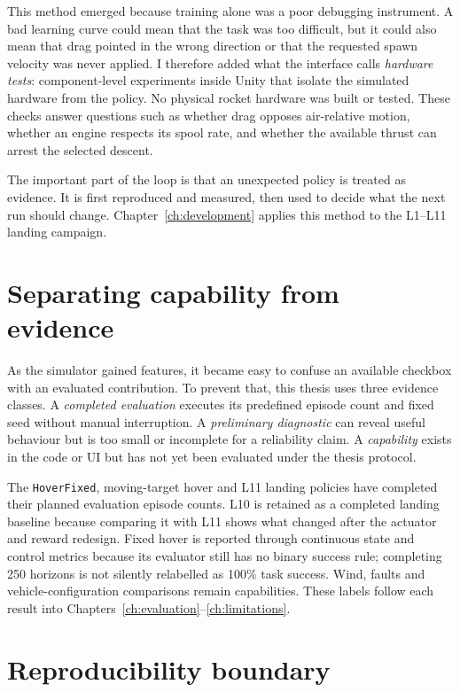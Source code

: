 This method emerged because training alone was a poor debugging instrument. A bad learning
curve could mean that the task was too difficult, but it could also mean that drag pointed in
the wrong direction or that the requested spawn velocity was never applied. I therefore added
what the interface calls \emph{hardware tests}: component-level experiments inside Unity that
isolate the simulated hardware from the policy. No physical rocket hardware was built or
tested. These checks answer questions such as whether drag opposes air-relative motion, whether
an engine respects its spool rate, and whether the available thrust can arrest the selected
descent.

The important part of the loop is that an unexpected policy is treated as evidence. It is first
reproduced and measured, then used to decide what the next run should change. Chapter~\ref{ch:development}
applies this method to the L1--L11 landing campaign.

\section{Separating capability from evidence}

As the simulator gained features, it became easy to confuse an available checkbox with an
evaluated contribution. To prevent that, this thesis uses three evidence classes. A
\emph{completed evaluation} executes its predefined episode count and fixed seed without manual
interruption. A \emph{preliminary diagnostic} can reveal useful behaviour but is too small or
incomplete for a reliability claim. A \emph{capability} exists in the code or UI but has not yet
been evaluated under the thesis protocol.

The \texttt{HoverFixed}, moving-target hover and L11 landing policies have completed their
planned evaluation episode counts. L10 is retained as a completed landing baseline because
comparing it with L11 shows what changed after the actuator and reward redesign. Fixed hover is
reported through continuous state and control metrics because its evaluator still has no binary
success rule; completing 250 horizons is not silently relabelled as 100\% task success. Wind,
faults and vehicle-configuration comparisons remain capabilities. These labels follow each
result into Chapters~\ref{ch:evaluation}--\ref{ch:limitations}.

\section{Reproducibility boundary}

